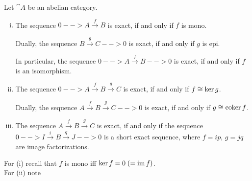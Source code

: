	\begin{lemma}
		Let $\cat{A}$ be an abelian category.
		\begin{enumerate}[(i)]
			\item{
				The sequence $0 --> A \xrightarrow{f} B$ is exact, if and only if $f$ is mono.

				Dually, the sequence $B \xrightarrow{g} C --> 0$ is exact, if and only if $g$ is epi.

				In particular, the sequence $0 --> A \xrightarrow{f} B --> 0$ is exact, if and only if $f$ is an isomorphism.
			}
			\item{
				The sequence $0 --> A \xrightarrow{f} B \xrightarrow{g} C$ is exact, if and only if $f \cong \ker g$.

				Dually, the sequence $A \xrightarrow{f} B \xrightarrow{g} C --> 0$ is exact, if and only if $g \cong \operatorname{coker} f$.
			}
			\item{
				The sequence $A \xrightarrow{f} B \xrightarrow{g} C$ is exact, if and only if the sequence $0 --> I \xrightarrow{i} B \xrightarrow{q} J --> 0$ is a short exact sequence, where $f = ip$, $g=jq$ are image factorizations.
			}
		\end{enumerate}
	\end{lemma}
	\begin{sketch}
		For (i) recall that $f$ is mono  iff $\ker f = 0 \;(= \operatorname{im} f)$.\\
		For (ii) note 
				
	\end{sketch}

